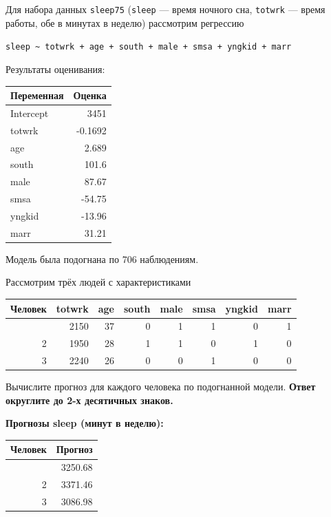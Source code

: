 \documentclass[
  russian,
]{article}
\newcounter{none} %
\begin{document}
Для набора данных \texttt{sleep75} (\texttt{sleep} --- время ночного
сна, \texttt{totwrk} --- время работы, обе в минутах в неделю)
рассмотрим регрессию

\texttt{sleep\ \textasciitilde{}\ totwrk\ +\ age\ +\ south\ +\ male\ +\ smsa\ +\ yngkid\ +\ marr}

Результаты оценивания:

{\def\LTcaptype{none} %
\begin{longtable}[]{@{}lr@{}}
\toprule\noalign{}
Переменная & Оценка \\
\midrule\noalign{}
\endhead
\bottomrule\noalign{}
\endlastfoot
Intercept & 3451 \\
totwrk & -0.1692 \\
age & 2.689 \\
south & 101.6 \\
male & 87.67 \\
smsa & -54.75 \\
yngkid & -13.96 \\
marr & 31.21 \\
\end{longtable}
}

Модель была подогнана по 706 наблюдениям.

Рассмотрим трёх людей с характеристиками

{\def\LTcaptype{none} %
\begin{longtable}[]{@{}rrrrrrrr@{}}
\toprule\noalign{}
Человек & totwrk & age & south & male & smsa & yngkid & marr \\
\midrule\noalign{}
\endhead
\bottomrule\noalign{}
\endlastfoot
1 & 2150 & 37 & 0 & 1 & 1 & 0 & 1 \\
2 & 1950 & 28 & 1 & 1 & 0 & 1 & 0 \\
3 & 2240 & 26 & 0 & 0 & 1 & 0 & 0 \\
\end{longtable}
}

Вычислите прогноз для каждого человека по подогнанной модели.
\textbf{Ответ округлите до 2-х десятичных знаков.}

\textbf{Прогнозы sleep (минут в неделю):}

{\def\LTcaptype{none} %
\begin{longtable}[]{@{}rr@{}}
\toprule\noalign{}
Человек & Прогноз \\
\midrule\noalign{}
\endhead
\bottomrule\noalign{}
\endlastfoot
1 & 3250.68 \\
2 & 3371.46 \\
3 & 3086.98 \\
\end{longtable}
}
\end{document}

